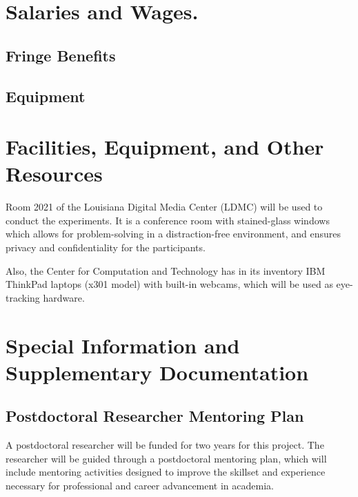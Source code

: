 \documentclass[hidelinks,11pt]{article}
\begin{document}
\section{ Salaries and Wages.  }

\subsection{ Fringe Benefits }

\subsection{ Equipment  }

\pagebreak
\section{ Facilities, Equipment, and Other Resources }

Room 2021 of the Louisiana Digital Media Center (LDMC) will be used to conduct
the experiments. It is a conference room with stained-glass windows which
allows for problem-solving in a distraction-free environment, and ensures
privacy and confidentiality for the participants.


Also, the Center for Computation and Technology has in its inventory IBM
ThinkPad laptops (x301 model) with built-in webcams, which will be used as
eye-tracking hardware. 

\pagebreak
\section{ Special Information and Supplementary Documentation }

\subsection{ Postdoctoral Researcher Mentoring Plan  }

A postdoctoral researcher will be funded for two years for this project. The
researcher will be guided through a postdoctoral mentoring plan, which will
include mentoring activities designed to improve the skillset and experience
necessary for professional and career advancement in academia.
\end{document}
